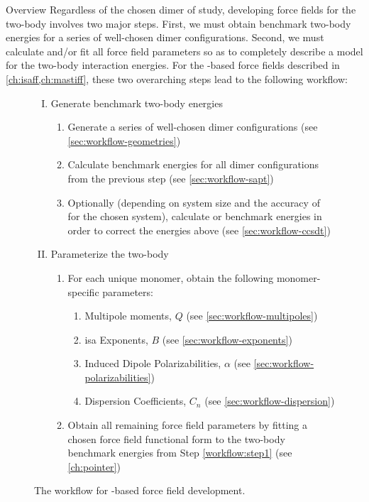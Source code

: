 \begin{section}{Overview}
Regardless of the chosen dimer of study, developing force fields for the
two-body \pes involves two major steps.  First, we must
obtain benchmark two-body energies for a series of well-chosen dimer
configurations. Second, we must
calculate and/or fit all force field parameters so as to completely describe a
model for the two-body interaction energies. For the \sapt-based force fields described in
\cref{ch:isaff,ch:mastiff}, 
these two overarching steps lead to the following workflow:
%
\begin{figure}
\begin{enumerate}[I.]
\item Generate benchmark two-body energies
\label{workflow:step1}
    \begin{enumerate}[1.]
    \item Generate a series of well-chosen dimer configurations
        (see \cref{sec:workflow-geometries})
    \item Calculate \dftsapt benchmark energies for all dimer configurations from
the previous step
        (see \cref{sec:workflow-sapt})
    \item Optionally (depending on system size and the accuracy of \dftsapt
for the chosen system), calculate \ccsdt or \ccsdtf benchmark energies in
order to correct the \dftsapt energies above
        (see \cref{sec:workflow-ccsdt})
    \end{enumerate}
\item Parameterize the two-body \pes
\label{workflow:step2}
    \begin{enumerate}[1.]
    \item For each unique monomer, obtain the following monomer-specific parameters:
        \begin{enumerate}
        \item Multipole moments, $Q$
            (see \cref{sec:workflow-multipoles})
        \item \acrshort{isa} Exponents, $B$ 
            (see \cref{sec:workflow-exponents})
        \item Induced Dipole Polarizabilities, $\alpha$
            (see \cref{sec:workflow-polarizabilities})
        \item Dispersion Coefficients, $C_n$
            (see \cref{sec:workflow-dispersion})
        \end{enumerate}
    \item Obtain all remaining force field parameters by fitting a chosen
    force field functional form to the two-body benchmark energies from Step \ref{workflow:step1}
        (see \cref{ch:pointer})
    \end{enumerate}
\end{enumerate}
\caption{The workflow for \sapt-based force field development.}
\end{figure}


\end{section}
